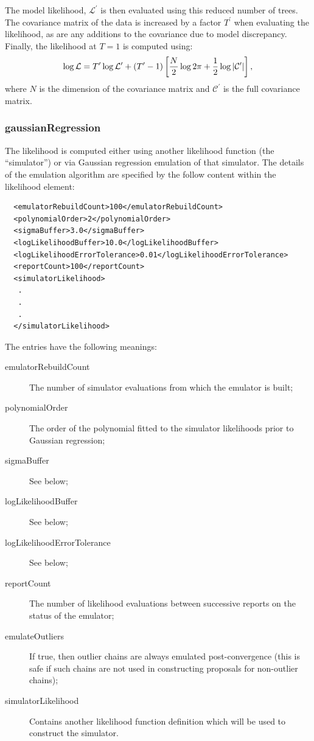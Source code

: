The model likelihood, $\mathcal{L}^\prime$ is then evaluated using this reduced number of trees. The covariance matrix of the data is increased by a factor $T^\prime$ when evaluating the likelihood, as are any additions to the covariance due to model discrepancy. Finally, the likelihood at $T=1$ is computed using:
\begin{equation}
\log \mathcal{L} = T^\prime \log \mathcal{L}^\prime + (T^\prime-1)\left[ {N \over 2} \log 2 \pi + {1 \over 2} \log |\mathcal{C}^\prime| \right],
\end{equation}
where $N$ is the dimension of the covariance matrix and $\mathcal{C}^\prime$ is the full covariance matrix.

\subsubsection{gaussianRegression}

The likelihood is computed either using another likelihood function (the ``simulator'') or via Gaussian regression emulation of that simulator. The details of the emulation algorithm are specified by the follow content within the {\normalfont \ttfamily likelihood} element:
\begin{verbatim}
  <emulatorRebuildCount>100</emulatorRebuildCount>
  <polynomialOrder>2</polynomialOrder>
  <sigmaBuffer>3.0</sigmaBuffer>
  <logLikelihoodBuffer>10.0</logLikelihoodBuffer>
  <logLikelihoodErrorTolerance>0.01</logLikelihoodErrorTolerance>
  <reportCount>100</reportCount>
  <simulatorLikelihood>
   .
   .
   .
  </simulatorLikelihood>
\end{verbatim}

The entries have the following meanings:
\begin{description}
\item[{\normalfont \ttfamily emulatorRebuildCount}] The number of simulator evaluations from which the emulator is built;
\item[{\normalfont \ttfamily polynomialOrder}] The order of the polynomial fitted to the simulator likelihoods prior to Gaussian regression;
\item[{\normalfont \ttfamily sigmaBuffer}] See below;
\item[{\normalfont \ttfamily logLikelihoodBuffer}] See below;
\item[{\normalfont \ttfamily logLikelihoodErrorTolerance}] See below;
\item[{\normalfont \ttfamily reportCount}] The number of likelihood evaluations between successive reports on the status of the emulator;
\item[{\normalfont \ttfamily emulateOutliers}] If true, then outlier chains are always emulated post-convergence (this is safe if such chains are not used in constructing proposals for non-outlier chains);
\item[{\normalfont \ttfamily simulatorLikelihood}] Contains another likelihood function definition which will be used to construct the simulator.
\end{description}

